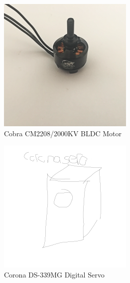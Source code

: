 \begin{figure}[htbp]
\begin{subfigure}{0.5\textwidth}
\centering
\includegraphics[width=\textwidth]{figs/cobra-motor}
\caption{Cobra CM2208/2000KV BLDC Motor}
\end{subfigure}
\begin{subfigure}{0.5\textwidth}
\centering
\includegraphics[width=\textwidth]{figs/corona-servo}
\caption{Corona DS-339MG Digital Servo}
\end{subfigure}
\caption{}
\end{figure}
